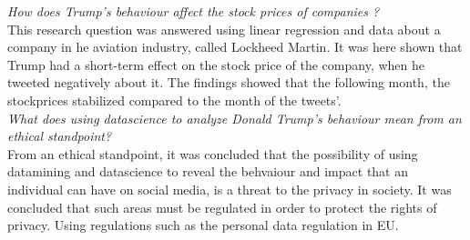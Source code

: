 \documentclass[11pt]{article}
\begin{document}
\textit{How does Trump's behaviour affect the stock prices of companies ?} \\

This research question was answered using linear regression and data about a company in he aviation industry, called Lockheed Martin. It was here shown that Trump had a short-term effect on the stock price of the company, when he tweeted negatively about it. The findings showed that the following month, the stockprices stabilized compared to the month of the tweets'.\\


\textit{What does using datascience to analyze Donald Trump's behaviour mean from an ethical standpoint?}\\
 
From an ethical standpoint, it was concluded that the possibility of using datamining and datascience to reveal the behvaiour and impact that an individual can have on social media, is a threat to the privacy in society. It was concluded that such areas must be regulated in order to protect the rights of privacy. Using regulations such as the personal data regulation in EU.  



\end{document}
